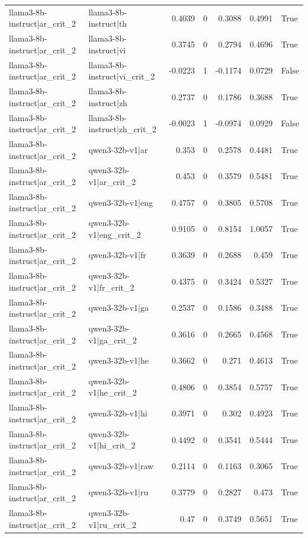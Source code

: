 \begin{table}
\begin{tabular}{l l r r r r l}
llama3-8b-instruct|ar_crit_2 & llama3-8b-instruct|th & 0.4039 & 0 & 0.3088 & 0.4991 & True \\
llama3-8b-instruct|ar_crit_2 & llama3-8b-instruct|vi & 0.3745 & 0 & 0.2794 & 0.4696 & True \\
llama3-8b-instruct|ar_crit_2 & llama3-8b-instruct|vi_crit_2 & -0.0223 & 1 & -0.1174 & 0.0729 & False \\
llama3-8b-instruct|ar_crit_2 & llama3-8b-instruct|zh & 0.2737 & 0 & 0.1786 & 0.3688 & True \\
llama3-8b-instruct|ar_crit_2 & llama3-8b-instruct|zh_crit_2 & -0.0023 & 1 & -0.0974 & 0.0929 & False \\
llama3-8b-instruct|ar_crit_2 & qwen3-32b-v1|ar & 0.353 & 0 & 0.2578 & 0.4481 & True \\
llama3-8b-instruct|ar_crit_2 & qwen3-32b-v1|ar_crit_2 & 0.453 & 0 & 0.3579 & 0.5481 & True \\
llama3-8b-instruct|ar_crit_2 & qwen3-32b-v1|eng & 0.4757 & 0 & 0.3805 & 0.5708 & True \\
llama3-8b-instruct|ar_crit_2 & qwen3-32b-v1|eng_crit_2 & 0.9105 & 0 & 0.8154 & 1.0057 & True \\
llama3-8b-instruct|ar_crit_2 & qwen3-32b-v1|fr & 0.3639 & 0 & 0.2688 & 0.459 & True \\
llama3-8b-instruct|ar_crit_2 & qwen3-32b-v1|fr_crit_2 & 0.4375 & 0 & 0.3424 & 0.5327 & True \\
llama3-8b-instruct|ar_crit_2 & qwen3-32b-v1|ga & 0.2537 & 0 & 0.1586 & 0.3488 & True \\
llama3-8b-instruct|ar_crit_2 & qwen3-32b-v1|ga_crit_2 & 0.3616 & 0 & 0.2665 & 0.4568 & True \\
llama3-8b-instruct|ar_crit_2 & qwen3-32b-v1|he & 0.3662 & 0 & 0.271 & 0.4613 & True \\
llama3-8b-instruct|ar_crit_2 & qwen3-32b-v1|he_crit_2 & 0.4806 & 0 & 0.3854 & 0.5757 & True \\
llama3-8b-instruct|ar_crit_2 & qwen3-32b-v1|hi & 0.3971 & 0 & 0.302 & 0.4923 & True \\
llama3-8b-instruct|ar_crit_2 & qwen3-32b-v1|hi_crit_2 & 0.4492 & 0 & 0.3541 & 0.5444 & True \\
llama3-8b-instruct|ar_crit_2 & qwen3-32b-v1|raw & 0.2114 & 0 & 0.1163 & 0.3065 & True \\
llama3-8b-instruct|ar_crit_2 & qwen3-32b-v1|ru & 0.3779 & 0 & 0.2827 & 0.473 & True \\
llama3-8b-instruct|ar_crit_2 & qwen3-32b-v1|ru_crit_2 & 0.47 & 0 & 0.3749 & 0.5651 & True \\

\end{tabular}
\end{table}

